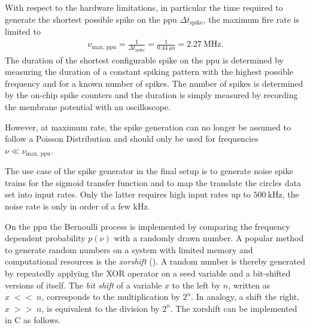 With respect to the hardware limitations, in particular the time required to generate the shortest possible spike on the \gls{ppu} $\Delta t_\text{spike}$, the maximum fire rate is limited to 
\begin{align*}
\nu_\text{max, ppu} = \frac{1}{\Delta t_\text{spike}} = \frac{1}{\SI{0.44}{\mu \s}} = \SI{2.27}{\mega \Hz}.
\end{align*}
The duration of the shortest configurable spike on the \gls{ppu} is determined by measuring the duration of a constant spiking pattern with the highest possible frequency and for a known number of spikes. The number of spikes is determined by the on-chip spike counters and the duration is simply measured by recording the membrane potential with an oscilloscope.

However, at maximum rate, the spike generation can no longer be assumed to follow a Poisson Distribution and should only be used for frequencies $\nu \ll \nu_\text{max, ppu}$.

The use case of the spike generator in the final setup is to generate noise spike trains for the sigmoid transfer function and to map the translate the circles data set into input rates. Only the latter requires high input rates up to $\SI{500}{\kilo \Hz}$, the noise rate is only in order of a few $\si{\kilo \Hz}$.

On the \gls{ppu} the Bernoulli process is implemented by comparing the frequency dependent probability $p(\nu)$ with a randomly drawn number. A popular method to generate random numbers on a system with limited memory and computational resources is the \emph{xorshift} (\citealp{marsaglia2003xorshift}). A random number is thereby generated by repeatedly applying the XOR operator on a seed variable and a bit-shifted versions of itself. The \emph{bit shift} of a variable $x$ to the left by $n$, written as $x\;{\scriptstyle<<}\;n$, corresponds to the multiplication by $2^n$. In analogy, a shift the right, $x\;{\scriptstyle>>}\;n$, is equivalent to the division by $2^n$. The xorshift can be implemented in C as follows.

